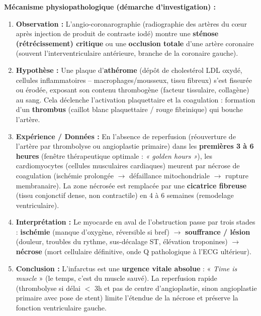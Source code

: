 \documentclass[11pt]{article}
\begin{document}
\noindent \textbf{Mécanisme physiopathologique (démarche d'investigation) :}
\begin{enumerate}
    \item \textbf{Observation :} L'angio-coronarographie (radiographie des artères du cœur après injection de produit de contraste iodé) montre une \textbf{sténose (rétrécissement) critique} ou une \textbf{occlusion totale} d'une artère coronaire (souvent l'interventriculaire antérieure, branche de la coronaire gauche).
    \item \textbf{Hypothèse :} Une plaque d'\textbf{athérome} (dépôt de cholestérol LDL oxydé, cellules inflammatoires -- macrophages/mousseux, tissu fibreux) s'est fissurée ou érodée, exposant son contenu thrombogène (facteur tissulaire, collagène) au sang. Cela déclenche l'activation plaquettaire et la coagulation : formation d'un \textbf{thrombus} (caillot blanc plaquettaire / rouge fibrinique) qui bouche l'artère.
    \item \textbf{Expérience / Données :} En l'absence de reperfusion (réouverture de l'artère par thrombolyse ou angioplastie primaire) dans les \textbf{premières 3 à 6 heures} (fenêtre thérapeutique optimale : \emph{« golden hours »}), les cardiomyocytes (cellules musculaires cardiaques) meurent par nécrose de coagulation (ischémie prolongée $\rightarrow$ défaillance mitochondriale $\rightarrow$ rupture membranaire). La zone nécrosée est remplacée par une \textbf{cicatrice fibreuse} (tissu conjonctif dense, non contractile) en 4 à 6 semaines (remodelage ventriculaire).
    \item \textbf{Interprétation :} Le myocarde en aval de l'obstruction passe par trois stades : \textbf{ischémie} (manque d'oxygène, réversible si bref) $\rightarrow$ \textbf{souffrance / lésion} (douleur, troubles du rythme, sus-décalage ST, élévation troponines) $\rightarrow$ \textbf{nécrose} (mort cellulaire définitive, onde Q pathologique à l'ECG ultérieur).
    \item \textbf{Conclusion :} L'infarctus est une \textbf{urgence vitale absolue} : « \emph{Time is muscle} » (le temps, c'est du muscle sauvé). La reperfusion rapide (thrombolyse si délai $<$ 3h et pas de centre d'angioplastie, sinon angioplastie primaire avec pose de stent) limite l'étendue de la nécrose et préserve la fonction ventriculaire gauche.
\end{enumerate}
\end{document}
